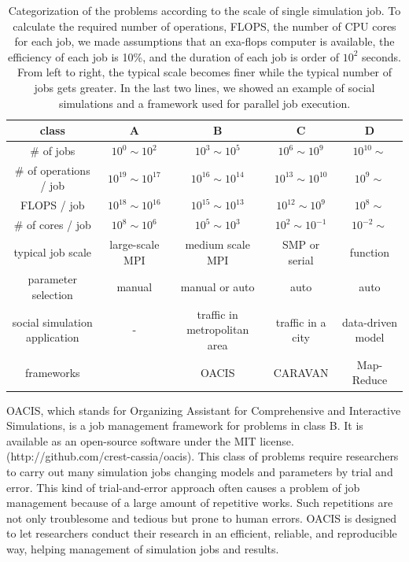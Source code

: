 \begin{table}[htb]
  \caption{Categorization of the problems according to the scale of single simulation job.
  To calculate the required number of operations, FLOPS, the number of CPU cores for each job, we made assumptions that an exa-flops computer is available, the efficiency of each job is 10\%, and the duration of each job is order of $10^2$ seconds.
  From left to right, the typical scale becomes finer while the typical number of jobs gets greater.
  In the last two lines, we showed an example of social simulations and a framework used for parallel job execution.
  }
  \label{tab:problem_scale}
  \centering
  \begin{tabular}{|c|cccc|} \hline
    class      & A                & B                & C                & D \\ \hline
    \# of jobs & $10^0 \sim 10^2$ & $10^3 \sim 10^5$ & $10^6 \sim 10^9$ & $10^{10} \sim$ \\
    \# of operations / job & $10^{19} \sim 10^{17}$ & $10^{16} \sim 10^{14}$ & $10^{13} \sim 10^{10}$ & $10^{9} \sim$ \\
    FLOPS / job & $10^{18} \sim 10^{16}$ & $10^{15} \sim 10^{13}$ & $10^{12} \sim 10^{9}$ & $10^{8} \sim$ \\
    \# of cores / job & $10^{8} \sim 10^{6}$ & $10^{5} \sim 10^{3}$ & $10^{2} \sim 10^{-1}$ & $10^{-2} \sim$ \\
    typical job scale & large-scale MPI & medium scale MPI & SMP or serial & function \\
    parameter selection & manual & manual or auto & auto & auto \\
    social simulation application & - & traffic in metropolitan area & traffic in a city & data-driven model \\
    frameworks & & OACIS & CARAVAN & Map-Reduce \\
    \hline
  \end{tabular}
\end{table}

OACIS, which stands for Organizing Assistant for Comprehensive and Interactive Simulations, is a job management framework for problems in class B\cite{murase_phys_proc}.
It is available as an open-source software under the MIT license. (http://github.com/crest-cassia/oacis).
This class of problems require researchers to carry out many simulation jobs changing models and parameters by trial and error.
This kind of trial-and-error approach often causes a problem of job management because of a large amount of repetitive works.
Such repetitions are not only troublesome and tedious but prone to human errors.
OACIS is designed to let researchers conduct their research in an efficient, reliable, and reproducible way, helping management of simulation jobs and results.

